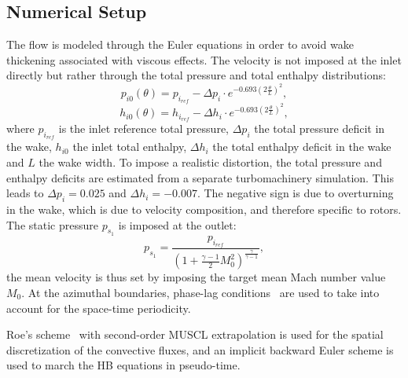 \subsection{Numerical Setup}

The flow is modeled through the 
Euler equations in order to avoid wake thickening
associated with viscous effects. 
The velocity is not imposed at the inlet directly
but rather through the total pressure and total enthalpy distributions:
\begin{equation}
  \label{eq:rotatingblocks_ptot}
    p_{i0} (\theta) = p_{i_{ref}} - 
        \Delta p_i \cdot e^{
          -0.693 \left( 2 \frac{\theta}{L} \right) ^ 2},
\end{equation}
\begin{equation}
  \label{eq:rotatingblocks_htot}
    h_{i0} (\theta) = h_{i_{ref}} - 
        \Delta h_i \cdot e^{
          -0.693 \left( 2 \frac{\theta}{L} \right) ^ 2},
\end{equation}
where $p_{i_{ref}}$ is the inlet reference total pressure, $\Delta p_i$ the total pressure
deficit in the wake,
$h_{i0}$ the inlet total enthalpy, $\Delta h_i$ the total enthalpy
deficit in the wake and $L$ the wake width.
To impose a realistic distortion, the total pressure and
enthalpy deficits are estimated from a separate turbomachinery simulation.
This leads to $\Delta p_i = 0.025$ and 
$\Delta h_i = - 0.007$.
The negative sign is due to overturning in the wake, which
is due to velocity composition, and therefore specific to rotors.
The static pressure $p_{s_1}$ is imposed at the outlet:
\begin{equation}
    p_{s_1} = \frac{p_{i_{ref}}}{\left(1 + 
    \frac{\gamma - 1}{2} M_{0}^2 \right) ^ {\frac{\gamma}{ \gamma - 1}}} ,
\end{equation}
the mean velocity is thus set by imposing the
target mean Mach number value $M_{0}$.
At the azimuthal boundaries, phase-lag conditions~\cite{Erdos1977} 
are used to take into account for the space-time periodicity.

Roe's scheme~\cite{Roe1981} with second-order MUSCL extrapolation 
is used for the spatial discretization of
the convective fluxes, and an implicit backward Euler scheme is used
to march the HB equations in pseudo-time.

